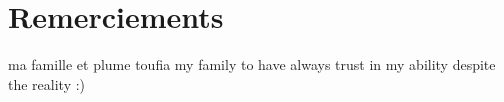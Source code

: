 \documentclass[english]{spimubphdthesis}
\begin{document}
\chapter*{Remerciements}
 ma famille  et plume toufia 
 my family to have always trust in my  ability despite the reality :)
\tableofcontents

\mainmatter
 


%  
%
%





\end{document}
